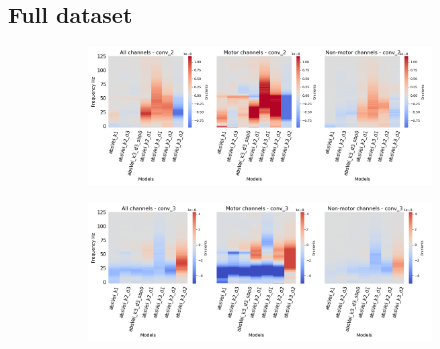 \subsection*{Full dataset}\label{subsec:absVel-full-dataset-appendixA}
\begin{figure}[!htb]
\centering
\begin{subfigure}[a]{\textwidth}
   \includegraphics[width=0.9\linewidth]{img/appendix/A/conv-2/m/absVel-model-gradients-all_kinds}
   \caption{}
   \label{fig:absVel-full-grads-conv-2}
\end{subfigure}

\begin{subfigure}[b]{\textwidth}
   \includegraphics[width=0.9\linewidth]{img/appendix/A/conv-3/m/absVel-model-gradients-all_kinds}
   \caption{}
   \label{fig:absVel-full-grads-conv-3}
\end{subfigure}
\end{figure}
\clearpage   

